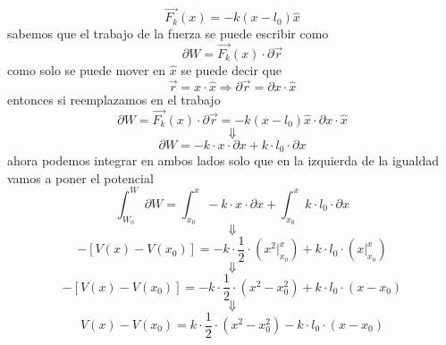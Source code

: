 \documentclass[../Main.tex]{subfiles}
\begin{document}
\npage{
}
{

\begin{equation*}
    \vec{F_k} (x) = - k \left( x - l_0 \right) \hat{x}
\end{equation*}
sabemos que el trabajo de la fuerza se puede escribir como
\begin{equation*}
    \partial W = \vec{F_k} (x) \cdot \partial \vec{r}
\end{equation*}
como solo se puede mover en $\hat{x}$ se puede decir que
\begin{equation*}
    \vec{r} = x \cdot \hat{x} \Rightarrow \partial \vec{r} = \partial x \cdot \hat{x}
\end{equation*}
entonces si reemplazamos en el trabajo
\begin{equation*}
    \partial W = \vec{F_k} (x) \cdot \partial \vec{r} = - k \left( x - l_0 \right) \hat{x} \cdot \partial x \cdot \hat{x}
\end{equation*}
\begin{equation*}
    \Downarrow
\end{equation*}
\begin{equation*}
    \partial W = - k \cdot x \cdot \partial x + k \cdot l_0 \cdot \partial x
\end{equation*}
ahora podemos integrar en ambos lados solo que en la izquierda de la igualdad
vamos a poner el potencial
\begin{equation*}
    \int_{W_0}^W \partial W = \int_{x_0}^{x} - k \cdot x \cdot \partial x + \int_{x_0}^{x} k \cdot l_0 \cdot \partial x
\end{equation*}
\begin{equation*}
    \Downarrow
\end{equation*}
\begin{equation*}
    - \left[ V(x) - V(x_0) \right] = - k \cdot \frac{1}{2} \cdot \left( x ^2 |_{x_0}^{x} \right) + k \cdot l_0 \cdot \left( x |_{x_0}^{x} \right)
\end{equation*}
\begin{equation*}
    \Downarrow
\end{equation*}
\begin{equation*}
    - \left[ V(x) - V(x_0) \right] = - k \cdot \frac{1}{2} \cdot \left(x^2 - x_0^2 \right) + k \cdot l_0 \cdot \left( x - x_0 \right)
\end{equation*}
\begin{equation*}
    \Downarrow
\end{equation*}
\begin{equation*}
    V(x) - V(x_0) = k \cdot \frac{1}{2} \cdot \left(x^2 - x_0^2 \right) - k \cdot l_0 \cdot \left( x - x_0 \right)

\end{equation*}}
\end{document}
